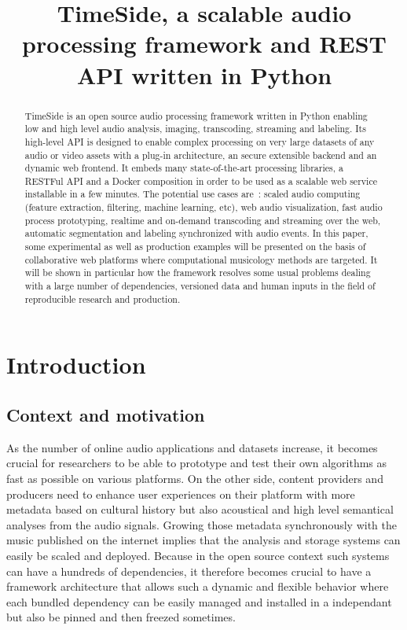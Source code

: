 \documentclass{article}
\title{TimeSide, a scalable audio processing framework and REST API written in Python}
\begin{document}
%
\maketitle
%
\begin{abstract}
TimeSide is an open source audio processing framework written in Python enabling low and high level audio analysis, imaging, transcoding, streaming and labeling. Its high-level API is designed to enable complex processing on very large datasets of any audio or video assets with a plug-in architecture, an secure extensible backend and an dynamic web frontend. It embeds many state-of-the-art processing libraries, a RESTFul API and a Docker composition in order to be used as a scalable web service installable in a few minutes. The potential use cases are : scaled audio computing (feature extraction, filtering, machine learning, etc), web audio visualization, fast audio process prototyping, realtime and on-demand transcoding and streaming over the web, automatic segmentation and labeling synchronized with audio events. In this paper, some experimental as well as production examples will be presented on the basis of collaborative web platforms where computational musicology methods are targeted. It will be shown in particular how the framework resolves some usual problems dealing with a large number of dependencies, versioned data and human inputs in the field of reproducible research and production.
\end{abstract}


\section{Introduction}

\subsection{Context and motivation}

As the number of online audio applications and datasets increase, it becomes crucial for researchers to be able to prototype and test their own algorithms as fast as possible on various platforms. On the other side, content providers and producers need to enhance user experiences on their platform with more metadata based on cultural history but also acoustical and high level semantical analyses from the audio signals. Growing those metadata synchronously with the music published on the internet implies that the analysis and storage systems can easily be scaled and deployed. Because in the open source context such systems can have a hundreds of dependencies, it therefore becomes crucial to have a framework architecture that allows such a dynamic and flexible behavior where each bundled dependency can be easily managed and installed in a independant but also be pinned and then freezed sometimes.
\end{document}
